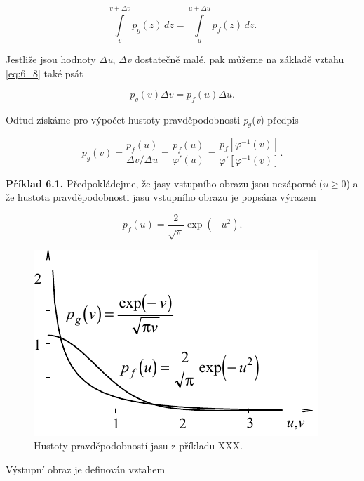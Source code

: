 \begin{equation} \label{eq:6_8}
    \int\limits_{v}^{v+\Delta v} p_g(z)\,dz = \int\limits_{u}^{u+\Delta u} p_f(z)\,dz.
\end{equation}

Jestliže jsou hodnoty $\Delta$\textit{u}, $\Delta$\textit{v} dostatečně malé, pak můžeme na základě vztahu \eqref{eq:6_8} také psát

\begin{equation} \label{eq:6_9}
    p_g(v)\Delta v = p_f(u)\Delta u.
\end{equation}

Odtud získáme pro výpočet hustoty pravděpodobnosti \textit{p}$_g$(\textit{v}) předpis

\begin{equation} \label{eq:6_10}
    p_g(v) = \frac{p_f(u)}{\Delta v / \Delta u} = \frac{p_f(u)}{\varphi'(u)} = \frac{p_f [\varphi^{-1}(v)]}{\varphi'[\varphi^{-1}(v)]}.
\end{equation}

\noindent \textbf{Příklad 6.1.} Předpokládejme, že jasy vstupního obrazu jsou nezáporné (\textit{u}$\geq$0) a že hustota pravděpodobnosti jasu vstupního obrazu je popsána výrazem

\begin{equation}
    p_f(u) = \frac{2}{\sqrt{\pi}} \exp(-u^2). \nonumber
\end{equation}

\begin{figure}[th]
    \begin{center}
        \includegraphics[scale=1.0]{06_bodoveoperace/images/img_6_3.pdf}
    \end{center}
    \caption{Hustoty pravděpodobností jasu z příkladu XXX.}
    \label{img:6_3}
\end{figure}

Výstupní obraz je definován vztahem

